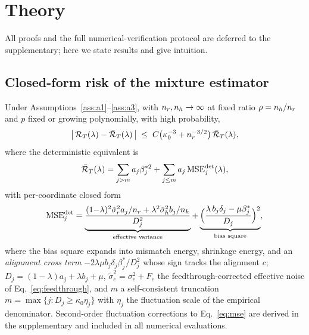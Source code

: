 \section{Theory}
\label{sec:theory}

All proofs and the full numerical-verification protocol are deferred to the supplementary; here we state results and give intuition.

\subsection{Closed-form risk of the mixture estimator}

\begin{theorem}\label{thm:t1a}
Under Assumptions~\ref{ass:a1}--\ref{ass:a3}, with $n_r,n_h \to \infty$ at fixed ratio $\rho = n_h/n_r$ and $p$ fixed or growing polynomially, with high probability,
\begin{equation}
  \big|\, \mathcal{R}_T(\lambda) - \bar{\mathcal{R}}_T(\lambda) \,\big|
  \;\le\; C\big(\kappa_0^{-3} + n_r^{-3/2}\big)\, \bar{\mathcal{R}}_T(\lambda),
  \label{eq:t1a-error}
\end{equation}
where the deterministic equivalent is
\begin{align}
  \bar{\mathcal{R}}_T(\lambda) = \sum_{j > m} a_j\beta_j^{*2} + \sum_{j \le m} a_j\, \mathrm{MSE}^{\det}_j(\lambda),
  \label{eq:t1a}
\end{align}
with per-coordinate closed form
\begin{align}
  \mathrm{MSE}^{\det}_j = \underbrace{\frac{(1{-}\lambda)^2 \tilde\sigma_r^2 a_j / n_r + \lambda^2 \tilde\sigma_h^2 b_j / n_h}{D_j^2}}_{\text{effective variance}}
  + \underbrace{\Big(\frac{\lambda\, b_j \delta_j - \mu \beta^*_j}{D_j}\Big)^2}_{\text{bias square}},
  \label{eq:mse}
\end{align}
where the bias square expands into mismatch energy, shrinkage energy, and an \emph{alignment cross term} $-2\lambda\mu b_j \delta_j \beta^*_j / D_j^2$ whose sign tracks the alignment $c$;
$D_j = (1-\lambda) a_j + \lambda b_j + \mu$, $\tilde\sigma_e^2 = \sigma_e^2 + F_e$ the feedthrough-corrected effective noise of Eq.~\eqref{eq:feedthrough}, and $m$ a self-consistent truncation $m = \max\{j : D_j \ge \kappa_0 \eta_j\}$ with $\eta_j$ the fluctuation scale of the empirical denominator.
Second-order fluctuation corrections to Eq.~\eqref{eq:mse} are derived in the supplementary and included in all numerical evaluations.
\end{theorem}

